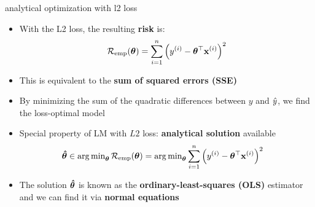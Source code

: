 \documentclass[11pt,compress,t,notes=noshow, xcolor=table]{beamer}
\begin{document}
\begin{vbframe}{analytical optimization with l2 loss}

\begin{itemize}
    \item With the L2 loss, the resulting \textbf{risk} is:
    $$\mathcal{R}_{\text{emp}}(\bm{\theta}) = \sum\limits_{i=1}^n \left(y^{(i)} - \bm{\theta}^\top \mathbf{x}^{(i)} \right)^2$$
    \item This is equivalent to the \textbf{sum of squared errors (SSE)}
    \item By minimizing the sum of the quadratic differences between $y$ and $\hat{y}$, we find the loss-optimal model
    \item Special property of LM with $L2$ loss: \textbf{analytical solution} available
    \begin{align*}
        \thetabh \in 
        \argmin_{\thetab} \risket &=
        \argmin_{\thetab} \sumin \left(\yi - \thetab^\top \xi \right)^2  %
    \end{align*}
    \normalsize
    \item The solution $\bm{\hat\theta}$ is known as the \textbf{ordinary-least-squares (OLS)} estimator and we can find it via \textbf{normal equations}
\end{itemize}

\end{vbframe}

\end{document}
